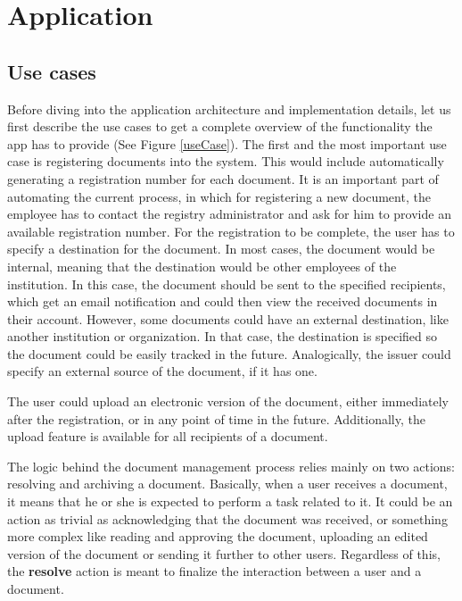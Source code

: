 \chapter{Application}
\label{chapter:application}


\section{Use cases}
\label{section:useCases}

Before diving into the application architecture and implementation details, let us first describe the use cases to get a complete overview of the functionality the app has to provide (See Figure \ref{useCase}). The first and the most important use case is registering documents into the system. This would include automatically generating a registration number for each document. It is an important part of automating the current process, in which for registering a new document, the employee has to contact the registry administrator and ask for him to provide an available registration number. For the registration to be complete, the user has to specify a destination for the document. In most cases, the document would be internal, meaning that the destination would be other employees of the institution. In this case, the document should be sent to the specified recipients, which get an email notification and could then view the received documents in their account. However, some documents could have an external destination, like another institution or organization. In that case, the destination is specified so the document could be easily tracked in the future. Analogically, the issuer could specify an external source of the document, if it has one.

The user could upload an electronic version of the document, either immediately after the registration, or in any point of time in the future. Additionally, the upload feature is available for all recipients of a document.

The logic behind the document management process relies mainly on two actions: resolving and archiving a document. Basically, when a user receives a document, it means that he or she is expected to perform a task related to it. It could be an action as trivial as acknowledging that the document was received, or something more complex like reading and approving the document, uploading an edited version of the document or sending it further to other users. Regardless of this, the \textbf{resolve} action is meant to finalize the interaction between a user and a document.

